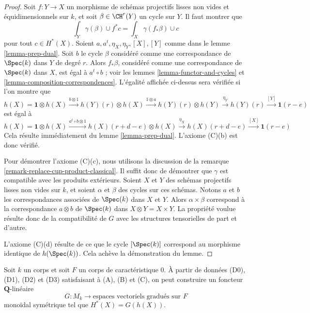 \begin{proof}
\medskip\noindent
Soit $f : Y \to X$ un morphisme de schémas projectifs lisses
non vides et équidimensionnels sur $k$,
et soit $\beta \in \CH^r(Y)$ un cycle sur $Y$. Il faut montrer que
$$
\int_Y \gamma(\beta) \cup f^*c = \int_X \gamma(f_*\beta) \cup c
$$
pour tout $c \in H^*(X)$. Soient $a, a^t, \eta_X, \eta_Y, [X], [Y]$
comme dans le lemme \ref{lemma-prep-dual}.
Soit $b$ le cycle $\beta$ considéré comme une correspondance de $\Spec(k)$ dans $Y$
de degré $r$. Alors $f_*\beta$, considéré comme une correspondance de
$\Spec(k)$ dans $X$, est égal à $a^t \circ b$ ; voir
les lemmes \ref{lemma-functor-and-cycles} et
\ref{lemma-composition-correspondences}.
L'égalité affichée ci-dessus sera vérifiée si l'on montre que
$$
h(X) = \mathbf{1} \otimes h(X)
\xrightarrow{b \otimes 1}
h(Y)(r) \otimes h(X)
\xrightarrow{1 \otimes a}
h(Y)(r) \otimes h(Y)
\xrightarrow{\eta_Y}
h(Y)(r)
\xrightarrow{[Y]}
\mathbf{1}(r - e)
$$
est égal à
$$
h(X) = \mathbf{1} \otimes h(X)
\xrightarrow{a^t \circ b \otimes 1}
h(X)(r + d - e) \otimes h(X)
\xrightarrow{\eta_X}
h(X)(r + d - e)
\xrightarrow{[X]}
\mathbf{1}(r - e)
$$
Cela résulte immédiatement du lemme \ref{lemma-prep-dual}.
L'axiome (C)(b) est donc vérifié.

\medskip\noindent
Pour démontrer l'axiome (C)(c), nous utilisons la discussion de
la remarque \ref{remark-replace-cup-product-classical}.
Il suffit donc de démontrer que $\gamma$ est compatible avec
les produits extérieurs. Soient $X$ et $Y$ des schémas projectifs lisses
non vides sur $k$, et soient $\alpha$ et $\beta$ des cycles sur ces schémas. Notons
$a$ et $b$ les correspondances associées de $\Spec(k)$ dans
$X$ et $Y$. Alors $\alpha \times \beta$ correspond à
la correspondance $a \otimes b$ de $\Spec(k)$ dans $X \otimes Y = X \times Y$.
La propriété voulue résulte donc de la compatibilité de $G$
avec les structures tensorielles de part et d'autre.

\medskip\noindent
L'axiome (C)(d) résulte de ce que le cycle $[\Spec(k)]$
correspond au morphisme identique de $h(\Spec(k))$.
Cela achève la démonstration du lemme.
\end{proof}

\begin{lemma}
\label{lemma-from-weil-to-functor}
Soit $k$ un corps et soit $F$ un corps de caractéristique $0$. À partir de données
(D0), (D1), (D2) et (D3) satisfaisant à (A), (B) et (C),
on peut construire un foncteur $\mathbf{Q}$-linéaire
$$
G : M_k \longrightarrow \text{espaces vectoriels gradués sur }F\text{}
$$
monoïdal symétrique tel que $H^*(X) = G(h(X))$.
\end{lemma}

